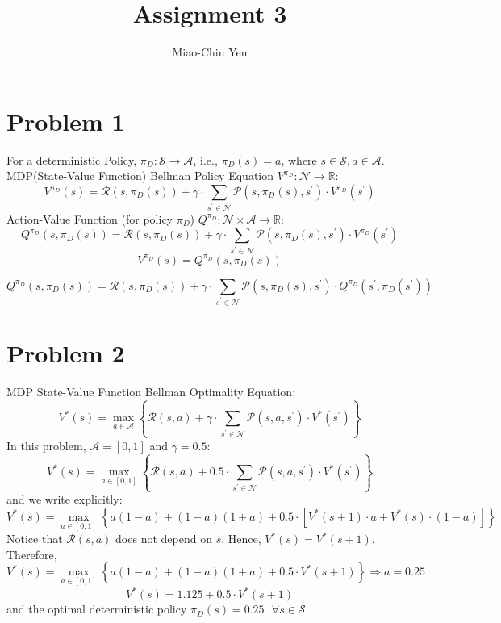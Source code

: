 \documentclass{article}
\title{Assignment 3}
\author{Miao-Chin Yen}
\begin{document}
\maketitle

\section*{Problem 1}
\hspace{1em}For a deterministic Policy, $\pi_{D}: \mathcal{S}\rightarrow \mathcal{A}$, i.e., $\pi_{D}(s) = a$, where $s\in \mathcal{S}, a\in\mathcal{A}$.\\
MDP(State-Value Function) Bellman Policy Equation $V^{\pi_{D}}: \mathcal{N} \rightarrow \mathbb{R}$:
$$
V^{\pi_{D}}(s)=\mathcal{R}(s, \pi_{D}(s))+\gamma \cdot \sum_{s^{\prime} \in \mathcal{N}} \mathcal{P}\left(s,\pi_{D}(s) , s^{\prime}\right) \cdot V^{\pi_{D}}\left(s^{\prime}\right)
$$
Action-Value Function (for policy $\pi_{D}$) $Q^{\pi_{D}}: \mathcal{N} \times \mathcal{A} \rightarrow \mathbb{R}$:
$$Q^{\pi_{D}}(s, \pi_{D}(s))=\mathcal{R}(s, \pi_{D}(s))+\gamma \cdot \sum_{s^{\prime} \in \mathcal{N}} \mathcal{P}\left(s,\pi_{D}(s) , s^{\prime}\right) \cdot V^{\pi_{D}}\left(s^{\prime}\right)
$$
$$
V^{\pi_{D}}(s)=Q^{\pi_{D}}(s, \pi_{D}(s))
$$

$$
Q^{\pi_{D}}(s, \pi_{D}(s))=\mathcal{R}(s, \pi_{D}(s))+\gamma \cdot \sum_{s^{\prime} \in \mathcal{N}} \mathcal{P}\left(s, \pi_{D}(s), s^{\prime}\right)   \cdot Q^{\pi_{D}}\left(s^{\prime}, \pi_{D}(s^{\prime})\right)
$$

\section*{Problem 2}
MDP State-Value Function Bellman Optimality Equation:
$$
V^{*}(s)=\max _{a \in \mathcal{A}}\left\{\mathcal{R}(s, a)+\gamma \cdot \sum_{s^{\prime} \in \mathcal{N}} \mathcal{P}\left(s, a, s^{\prime}\right) \cdot V^{*}\left(s^{\prime}\right)\right\}
$$
In this problem, $\mathcal{A}=[0,1 ]$ and $\gamma = 0.5$:
$$
V^{*}(s)=\max _{a \in [0,1]}\left\{\mathcal{R}(s, a)+ 0.5 \cdot \sum_{s^{\prime} \in \mathcal{N}} \mathcal{P}\left(s, a, s^{\prime}\right) \cdot V^{*}\left(s^{\prime}\right)\right\}
$$
and we write explicitly:
$$
V^{*}(s)=\max _{a \in [0,1]}\left\{a(1-a)+(1-a)(1+a) + 0.5 \cdot[V^{*}(s+1)\cdot a + V^{*}(s)\cdot (1-a)] \right\}
$$
Notice that $\mathcal{R}(s, a)$ does not depend on $s$. Hence, $V^{*}(s) = V^{*}(s+1)$. Therefore,
$$
V^{*}(s)=\max _{a \in [0,1]}\left\{a(1-a)+(1-a)(1+a) + 0.5 \cdot V^{*}(s+1) \right\}  \Longrightarrow a = 0.25
$$
$$
V^{*}(s)=1.125+ 0.5 \cdot V^{*}(s+1) 
$$
and the optimal deterministic policy $\pi_{D}(s)= 0.25 \text{ }\forall s \in \mathcal{S}$
\end{document}
